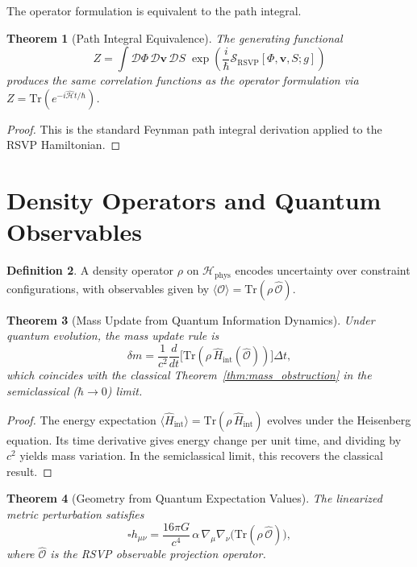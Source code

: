 \documentclass[12pt,a4paper,openany]{book}
\theoremstyle{plain}
\newtheorem{theorem}{Theorem}[chapter]
\theoremstyle{definition}
\newtheorem{definition}[theorem]{Definition}
\theoremstyle{remark}
\begin{document}
The operator formulation is equivalent to the path integral.

\begin{theorem}[Path Integral Equivalence]
\label{thm:path_integral_qm}
The generating functional
\[
Z = \int \mathcal{D}\Phi\,\mathcal{D}\mathbf{v}\,\mathcal{D}S\;\exp\!\left(\frac{i}{\hbar}\mathcal{S}_{\mathrm{RSVP}}[\Phi,\mathbf{v},S;g]\right)
\]
produces the same correlation functions as the operator formulation via $Z = \mathrm{Tr}(e^{-i\hat{\mathcal{H}}t/\hbar})$.
\end{theorem}

\begin{proof}
This is the standard Feynman path integral derivation applied to the RSVP Hamiltonian.
\end{proof}

\section{Density Operators and Quantum Observables}

\begin{definition}
A density operator $\rho$ on $\mathcal{H}_{\mathrm{phys}}$ encodes uncertainty over constraint configurations, with observables given by $\langle\mathcal{O}\rangle = \mathrm{Tr}(\rho\,\hat{\mathcal{O}})$.
\end{definition}

\begin{theorem}[Mass Update from Quantum Information Dynamics]
\label{thm:mass_info_quantum}
Under quantum evolution, the mass update rule is
\[
\delta m = \frac{1}{c^2}\frac{d}{dt}\bigl[\mathrm{Tr}(\rho\,\hat{H}_{\mathrm{int}}(\hat{\mathcal{O}}))\bigr]\Delta t,
\]
which coincides with the classical Theorem~\ref{thm:mass_obstruction} in the semiclassical ($\hbar \to 0$) limit.
\end{theorem}

\begin{proof}
The energy expectation $\langle\hat{H}_{\mathrm{int}}\rangle = \mathrm{Tr}(\rho\,\hat{H}_{\mathrm{int}})$ evolves under the Heisenberg equation. Its time derivative gives energy change per unit time, and dividing by $c^2$ yields mass variation. In the semiclassical limit, this recovers the classical result.
\end{proof}

\begin{theorem}[Geometry from Quantum Expectation Values]
\label{thm:quantum_gravity}
The linearized metric perturbation satisfies
\[
\square h_{\mu\nu} = \frac{16\pi G}{c^4}\,\alpha\,\nabla_\mu\nabla_\nu\bigl(\mathrm{Tr}(\rho\,\hat{\mathcal{O}})\bigr),
\]
where $\hat{\mathcal{O}}$ is the RSVP observable projection operator.
\end{theorem}
\end{document}
